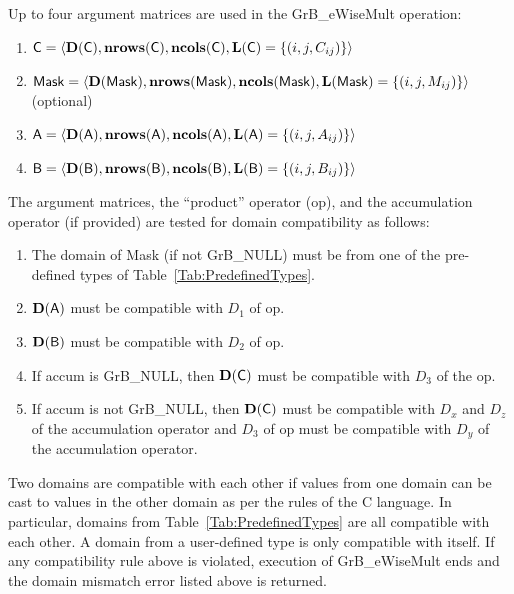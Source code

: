 Up to four argument matrices are used in the {\sf GrB\_eWiseMult} operation:
\begin{enumerate}
	\item ${\sf C} = \langle \bold{D}({\sf C}),\bold{nrows}({\sf C}),\bold{ncols}({\sf C}),\bold{L}({\sf C}) = \{(i,j,C_{ij}) \} \rangle$
	\item ${\sf Mask} = \langle \bold{D}({\sf Mask}),\bold{nrows}({\sf Mask}),\bold{ncols}({\sf Mask}),\bold{L}({\sf Mask}) = \{(i,j,M_{ij}) \} \rangle$ (optional)
	\item ${\sf A} = \langle \bold{D}({\sf A}),\bold{nrows}({\sf A}), \bold{ncols}({\sf A}),\bold{L}({\sf A}) = \{(i,j,A_{ij}) \} \rangle$
	\item ${\sf B} = \langle \bold{D}({\sf B}),\bold{nrows}({\sf B}), \bold{ncols}({\sf B}),\bold{L}({\sf B}) = \{(i,j,B_{ij}) \} \rangle$
\end{enumerate}

The argument matrices, the ``product'' operator ({\sf op}), and the accumulation 
operator (if provided) are tested for domain compatibility as follows:
\begin{enumerate}
	\item The domain of {\sf Mask} (if not {\sf GrB\_NULL}) must be from one of the pre-defined types of Table~\ref{Tab:PredefinedTypes}.

	\item $\bold{D}({\sf A})$ must be compatible with $D_1$ of {\sf op}.

	\item $\bold{D}({\sf B})$ must be compatible with $D_2$ of {\sf op}.

	\item If {\sf accum} is {\sf GrB\_NULL}, then $\bold{D}({\sf C})$ must be 
    compatible with $D_3$ of the {\sf op}.

	\item If {\sf accum} is not {\sf GrB\_NULL}, then $\bold{D}({\sf C})$ must be
    compatible with $D_x$ and $D_z$ of the accumulation operator and $D_3$ of
    {\sf op} must be compatible with $D_y$ of the accumulation operator.
\end{enumerate}
Two domains are compatible with each other if values from one domain can be cast 
to values in the other domain as per the rules of the C language.
In particular, domains from Table~\ref{Tab:PredefinedTypes} are all compatible 
with each other. A domain from a user-defined type is only compatible with itself.
If any compatibility rule above is violated, execution of {\sf GrB\_eWiseMult} ends
and the domain mismatch error listed above is returned.

